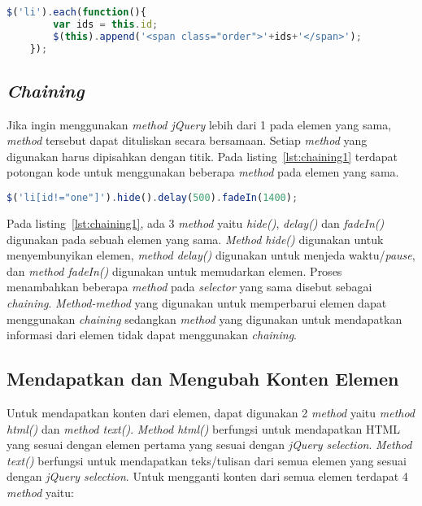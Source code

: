 \begin{lstlisting}[language=Javascript, caption=Menambah setiap elemen \textit{list} dengan id \textit{list} masing-masing , label={lst:jQuery6}]
	$('li').each(function(){
		var ids = this.id;
		$(this).append('<span class="order">'+ids+'</span>');
	});
\end{lstlisting}

\subsection{\textit{Chaining}}
Jika ingin menggunakan \textit{method jQuery} lebih dari 1 pada elemen yang sama, \textit{method} tersebut dapat dituliskan secara bersamaan. Setiap \textit{method} yang digunakan harus dipisahkan dengan titik. Pada listing~\ref{lst:chaining1} terdapat potongan kode untuk menggunakan beberapa \textit{method} pada elemen yang sama. 

\begin{lstlisting}[language=Javascript, caption=Menggunakan beberapa \textit{method} pada elemen yang sama, label={lst:chaining1}]
	$('li[id!="one"]').hide().delay(500).fadeIn(1400);
\end{lstlisting}

Pada listing~\ref{lst:chaining1}, ada 3 \textit{method} yaitu \textit{hide()}, \textit{delay()} dan \textit{fadeIn()} digunakan pada sebuah elemen yang sama. \textit{Method hide()} digunakan untuk menyembunyikan elemen, \textit{method delay()} digunakan untuk menjeda waktu/\textit{pause}, dan \textit{method fadeIn()} digunakan untuk memudarkan elemen. Proses menambahkan beberapa \textit{method} pada \textit{selector} yang sama disebut sebagai \textit{chaining}. \textit{Method-method} yang digunakan untuk memperbarui elemen dapat menggunakan \textit{chaining} sedangkan \textit{method} yang digunakan untuk mendapatkan informasi dari elemen tidak dapat menggunakan \textit{chaining}. 

\subsection{Mendapatkan dan Mengubah Konten Elemen}
Untuk mendapatkan konten dari elemen, dapat digunakan 2 \textit{method} yaitu \textit{method html()} dan \textit{method text()}. \textit{Method html()} berfungsi untuk mendapatkan HTML yang sesuai dengan elemen pertama yang sesuai dengan \textit{jQuery selection}. \textit{Method text()} berfungsi untuk mendapatkan teks/tulisan dari semua elemen yang sesuai dengan \textit{jQuery selection}. Untuk mengganti konten dari semua elemen terdapat 4 \textit{method} yaitu:


